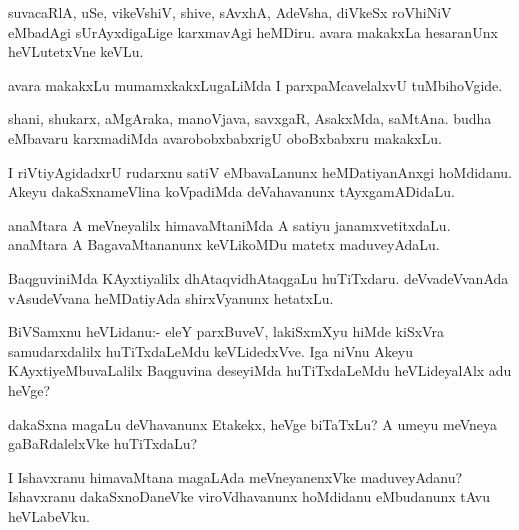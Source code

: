 \documentclass{article}
\begin{document}
\begin{mn}%
suvacaRlA, uSe, vikeVshiV, shive, sAvxhA, AdeVsha, diVkeSx roVhiNiV
eMbadAgi sUrAyxdigaLige karxmavAgi heMDiru. avara makakxLa hesaranUnx
heVLutetxVne keVLu.
\end{mn}

\begin{mn}
avara makakxLu mumamxkakxLugaLiMda I parxpaMcavelalxvU tuMbihoVgide.
\end{mn}

\begin{mn}
shani, shukarx, aMgAraka, manoVjava, savxgaR, AsakxMda, saMtAna. budha
eMbavaru karxmadiMda avarobobxbabxrigU oboBxbabxru makakxLu.
\end{mn}

\begin{mn}
I riVtiyAgidadxrU rudarxnu satiV eMbavaLanunx heMDatiyanAnxgi
hoMdidanu. Akeyu dakaSxnameVlina koVpadiMda deVahavanunx tAyxgamADidaLu.
\end{mn}

\begin{mn}%
anaMtara A meVneyalilx himavaMtaniMda A satiyu
janamxvetitxdaLu. anaMtara A BagavaMtananunx keVLikoMDu matetx maduveyAdaLu.
\end{mn}

\begin{mn}
BaqguviniMda KAyxtiyalilx dhAtaqvidhAtaqgaLu
huTiTxdaru. deVvadeVvanAda vAsudeVvana heMDatiyAda shirxVyanunx hetatxLu.
\end{mn}

%
%


%

\begin{mn}%
BiVSamxnu heVLidanu:- eleY parxBuveV, lakiSxmXyu hiMde kiSxVra
samudarxdalilx huTiTxdaLeMdu keVLidedxVve. Iga niVnu Akeyu
KAyxtiyeMbuvaLalilx Baqguvina deseyiMda huTiTxdaLeMdu heVLideyalAlx
adu heVge?
\end{mn}

\begin{mn}
dakaSxna magaLu deVhavanunx Etakekx, heVge biTaTxLu? A umeyu meVneya
gaBaRdalelxVke huTiTxdaLu?
\end{mn}

\begin{mn}
I Ishavxranu himavaMtana magaLAda meVneyanenxVke maduveyAdanu?
Ishavxranu dakaSxnoDaneVke viroVdhavanunx hoMdidanu eMbudanunx tAvu heVLabeVku.
\end{mn}
\end{document}
